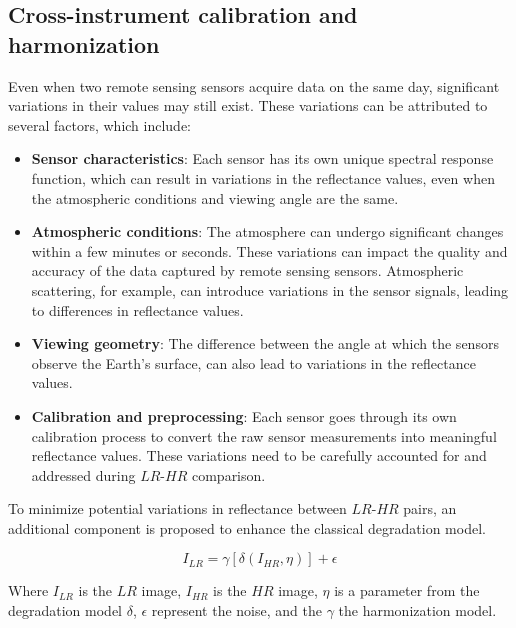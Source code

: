 \subsection{Cross-instrument calibration and harmonization}
Even when two remote sensing sensors acquire data on the same day, significant variations in their values may still exist. These variations can be attributed to several factors, which include:


\begin{itemize}
    \item \textbf{Sensor characteristics}: Each sensor has its own unique spectral response function, which can result in variations in the reflectance values, even when the atmospheric conditions and viewing angle are the same.

    \item \textbf{Atmospheric conditions}: The atmosphere can undergo significant changes within a few minutes or seconds. These variations can impact the quality and accuracy of the data captured by remote sensing sensors. Atmospheric scattering, for example, can introduce variations in the sensor signals, leading to differences in reflectance values.

    \item \textbf{Viewing geometry}: The difference between the angle at which the sensors observe the Earth's surface, can also lead to variations in the reflectance values.

    \item \textbf{Calibration and preprocessing}: Each sensor goes through its own calibration process to convert the raw sensor measurements into meaningful reflectance values. These variations need to be carefully accounted for and addressed during $LR$-$HR$ comparison.
    
\end{itemize}

To minimize potential variations in reflectance between $LR$-$HR$ pairs, an additional component is proposed to enhance the classical degradation model.

\begin{equation}
    I_{LR} = \gamma[\delta(I_{HR}, \eta)] + \epsilon
\end{equation}

Where $I_{LR}$ is the $LR$ image, $I_{HR}$ is the $HR$ image, $\eta$ is a parameter from the degradation model $\delta$, $\epsilon$ represent the noise, and the $\gamma$ the harmonization model.